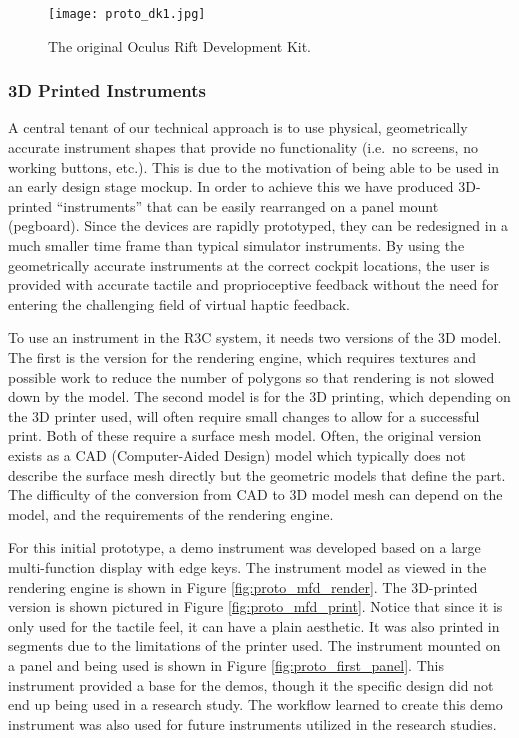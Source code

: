 \begin{figure}
    \centering
    \texttt{[image: proto\_dk1.jpg]}
    \caption{The original Oculus Rift Development Kit.}
    \label{fig:proto_oculus}
\end{figure}

\subsubsection{3D Printed Instruments}

A central tenant of our technical approach is to use physical, geometrically accurate instrument shapes that provide no functionality (i.e.\ no screens, no working buttons, etc.).
This is due to the motivation of being able to be used in an early design stage mockup.
In order to achieve this we have produced 3D-printed ``instruments'' that can be easily rearranged on a panel mount (pegboard).
Since the devices are rapidly prototyped, they can be redesigned in a much smaller time frame than typical simulator instruments.
By using the geometrically accurate instruments at the correct cockpit locations, the user is provided with accurate tactile and proprioceptive feedback without the need for entering the challenging field of virtual haptic feedback.

To use an instrument in the R3C system, it needs two versions of the 3D model.
The first is the version for the rendering engine, which requires textures and possible work to reduce the number of polygons so that rendering is not slowed down by the model.
The second model is for the 3D printing, which depending on the 3D printer used, will often require small changes to allow for a successful print.
Both of these require a surface mesh model.
Often, the original version exists as a CAD (Computer-Aided Design) model which typically does not describe the surface mesh directly but the geometric models that define the part.
The difficulty of the conversion from CAD to 3D model mesh can depend on the model, and the requirements of the rendering engine.

For this initial prototype, a demo instrument was developed based on a large multi-function display with edge keys.
The instrument model as viewed in the rendering engine is shown in Figure \ref{fig:proto_mfd_render}.
The 3D-printed version is shown pictured in Figure \ref{fig:proto_mfd_print}.
Notice that since it is only used for the tactile feel, it can have a plain aesthetic.
It was also printed in segments due to the limitations of the printer used.
The instrument mounted on a panel and being used is shown in Figure \ref{fig:proto_first_panel}.
This instrument provided a base for the demos, though it the specific design did not end up being used in a research study.
The workflow learned to create this demo instrument was also used for future instruments utilized in the research studies.


